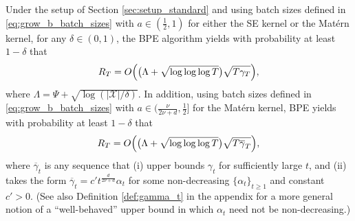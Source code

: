\documentclass[10pt]{article}
\begin{document}
\begin{theorem}
    \label{thm:upper_grow_b}
    Under the setup of Section \ref{sec:setup_standard} and
    using batch sizes defined in \eqref{eq:grow_b_batch_sizes} with $a\in(\frac{1}{2},1)$ for either the SE kernel or the Mat\'ern kernel,
    for any $\delta \in (0,1)$,
    the BPE algorithm yields with probability at least $1-\delta$ that
    \begin{align*}
    	R_T
        = O \Bigl(\bigl(\Lambda + \sqrt{\log \log\log T}\bigr)\sqrt{T\gamma_T}\Bigr),
    \end{align*}
    where $\Lambda=\Psi+\sqrt{\log(|\mathcal{X}|/\delta)}$.
    In addition, using batch sizes defined in \eqref{eq:grow_b_batch_sizes} with $a\in(\frac{\nu}{2\nu+d},\frac{1}{2}]$ for the Mat\'ern kernel,
    BPE yields with probability at least $1-\delta$ that
    \begin{align*}
    	R_T
        = O \Bigl(\bigl(\Lambda + \sqrt{\log \log\log T}\bigr)\sqrt{T\overline{\gamma}_T}\Bigr),
    \end{align*}
    where $\overline{\gamma}_t$ is any sequence that (i) upper bounds $\gamma_t$ for sufficiently large $t$, and (ii) takes the form $\overline{\gamma}_t = c't^{\frac{d}{2\nu+d}}\alpha_t$ for some non-decreasing $\{\alpha_t\}_{t \ge 1}$ and constant $c' > 0$.  (See also Definition \ref{def:gamma_t} in the appendix for a more general notion of a ``well-behaved'' upper bound in which $\alpha_t$ need not be non-decreasing.)
\end{theorem}
\end{document}

